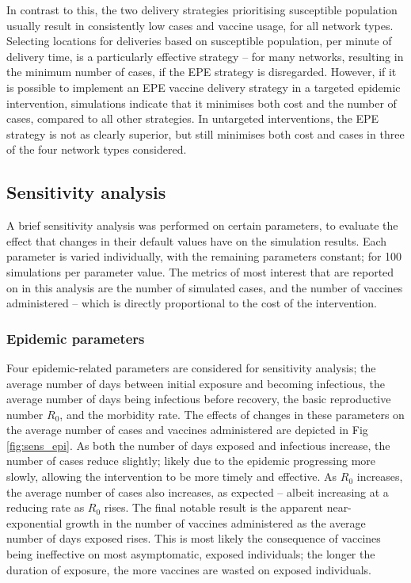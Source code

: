 \documentclass[10pt,letterpaper]{article}
\begin{document}
In contrast to this, the two delivery strategies prioritising susceptible population usually result in consistently low cases and vaccine usage, for all network types. Selecting locations for deliveries based on susceptible population, per minute of delivery time, is a particularly effective strategy -- for many networks, resulting in the minimum number of cases, if the EPE strategy is disregarded. However, if it is possible to implement an EPE vaccine delivery strategy in a targeted epidemic intervention, simulations indicate that it minimises both cost and the number of cases, compared to all other strategies. In untargeted interventions, the EPE strategy is not as clearly superior, but still minimises both cost and cases in three of the four network types considered.

\subsection*{Sensitivity analysis}
A brief sensitivity analysis was performed on certain parameters, to evaluate the effect that changes in their default values have on the simulation results. Each parameter is varied individually, with the remaining parameters constant; for 100 simulations per parameter value. The metrics of most interest that are reported on in this analysis are the number of simulated cases, and the number of vaccines administered -- which is directly proportional to the cost of the intervention.

\subsubsection*{Epidemic parameters}
Four epidemic-related parameters are considered for sensitivity analysis; the average number of days between initial exposure and becoming infectious, the average number of days being infectious before recovery, the basic reproductive number $R_{0}$, and the morbidity rate. The effects of changes in these parameters on the average number of cases and vaccines administered are depicted in Fig \ref{fig:sens_epi}. As both the number of days exposed and infectious increase, the number of cases reduce slightly; likely due to the epidemic progressing more slowly, allowing the intervention to be more timely and effective. As $R_{0}$ increases, the average number of cases also increases, as expected -- albeit increasing at a reducing rate as $R_{0}$ rises. The final notable result is the apparent near-exponential growth in the number of vaccines administered as the average number of days exposed rises. This is most likely the consequence of vaccines being ineffective on most asymptomatic, exposed individuals; the longer the duration of exposure, the more vaccines are wasted on exposed individuals.
\end{document}
